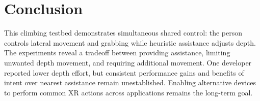 \section{Conclusion}
This climbing testbed demonstrates simultaneous shared control: the person
controls lateral movement and grabbing while heuristic assistance adjusts
depth. The experiments reveal a tradeoff between providing assistance,
limiting unwanted depth movement, and requiring additional movement.
One developer reported lower depth effort, but consistent performance gains
and benefits of intent over nearest assistance remain unestablished.
Enabling alternative devices to perform common XR actions across applications
remains the long-term goal.
